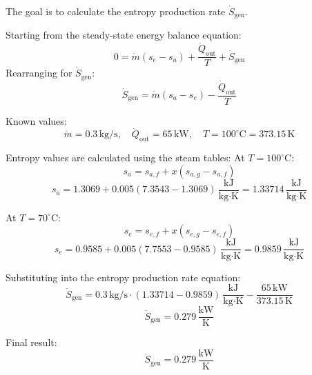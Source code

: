 The goal is to calculate the entropy production rate \( \dot{S}_{\text{gen}} \).  

Starting from the steady-state energy balance equation:  
\[
0 = \dot{m}(s_e - s_a) + \frac{\dot{Q}_{\text{out}}}{T} + \dot{S}_{\text{gen}}
\]  
Rearranging for \( \dot{S}_{\text{gen}} \):  
\[
\dot{S}_{\text{gen}} = \dot{m}(s_a - s_e) - \frac{\dot{Q}_{\text{out}}}{T}
\]  

Known values:  
\[
\dot{m} = 0.3 \, \text{kg/s}, \quad \dot{Q}_{\text{out}} = 65 \, \text{kW}, \quad T = 100^\circ\text{C} = 373.15 \, \text{K}
\]  

Entropy values are calculated using the steam tables:  
At \( T = 100^\circ\text{C} \):  
\[
s_a = s_{a,f} + x(s_{a,g} - s_{a,f})
\]  
\[
s_a = 1.3069 + 0.005(7.3543 - 1.3069) \, \frac{\text{kJ}}{\text{kg·K}} = 1.33714 \, \frac{\text{kJ}}{\text{kg·K}}
\]  

At \( T = 70^\circ\text{C} \):  
\[
s_e = s_{e,f} + x(s_{e,g} - s_{e,f})
\]  
\[
s_e = 0.9585 + 0.005(7.7553 - 0.9585) \, \frac{\text{kJ}}{\text{kg·K}} = 0.9859 \, \frac{\text{kJ}}{\text{kg·K}}
\]  

Substituting into the entropy production rate equation:  
\[
\dot{S}_{\text{gen}} = 0.3 \, \text{kg/s} \cdot (1.33714 - 0.9859) \, \frac{\text{kJ}}{\text{kg·K}} - \frac{65 \, \text{kW}}{373.15 \, \text{K}}
\]  
\[
\dot{S}_{\text{gen}} = 0.279 \, \frac{\text{kW}}{\text{K}}
\]  

Final result:  
\[
\dot{S}_{\text{gen}} = 0.279 \, \frac{\text{kW}}{\text{K}}
\]